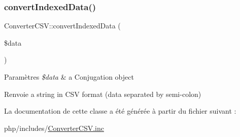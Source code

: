 \subsubsection{\texorpdfstring{convert\+Indexed\+Data()}{convertIndexedData()}}
{\footnotesize\ttfamily Converter\+C\+S\+V\+::convert\+Indexed\+Data (\begin{DoxyParamCaption}\item[{}]{\$data }\end{DoxyParamCaption})}


\begin{DoxyParams}{Paramètres}
{\em \$data} & a Conjugation object \\
\hline
\end{DoxyParams}
\begin{DoxyReturn}{Renvoie}
a string in C\+SV format (data separated by semi-\/colon) 
\end{DoxyReturn}


La documentation de cette classe a été générée à partir du fichier suivant \+:\begin{DoxyCompactItemize}
\item 
php/includes/\hyperlink{ConverterCSV_8inc}{Converter\+C\+S\+V.\+inc}\end{DoxyCompactItemize}
